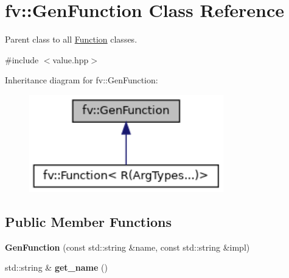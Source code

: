 \hypertarget{classfv_1_1GenFunction}{}\section{fv\+:\+:Gen\+Function Class Reference}
\label{classfv_1_1GenFunction}


Parent class to all \hyperlink{classfv_1_1Function}{Function} classes.  




{\ttfamily \#include $<$value.\+hpp$>$}



Inheritance diagram for fv\+:\+:Gen\+Function\+:
\nopagebreak
\begin{figure}[H]
\begin{center}
\leavevmode
\includegraphics[width=239pt]{classfv_1_1GenFunction__inherit__graph}
\end{center}
\end{figure}
\subsection*{Public Member Functions}
\begin{DoxyCompactItemize}
\item 
\hypertarget{classfv_1_1GenFunction_a1a4622c277f0a4645cc597ac7e8ffad3}{}\label{classfv_1_1GenFunction_a1a4622c277f0a4645cc597ac7e8ffad3} 
{\bfseries Gen\+Function} (const std\+::string \&name, const std\+::string \&impl)
\item 
\hypertarget{classfv_1_1GenFunction_ac821bad86421d773af1ba36f67174eb1}{}\label{classfv_1_1GenFunction_ac821bad86421d773af1ba36f67174eb1} 
std\+::string \& {\bfseries get\+\_\+name} ()
\end{DoxyCompactItemize}
